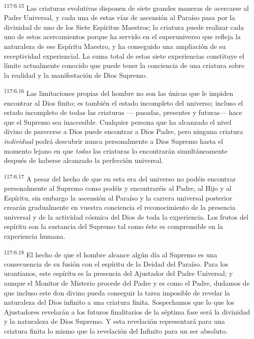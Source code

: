\documentclass[twoside, 11pt]{book}
\begin{document}
\par
\textsuperscript{117:6.15} Las criaturas evolutivas disponen de siete grandes maneras de acercarse al Padre Universal, y cada una de estas vías de ascensión al Paraíso pasa por la divinidad de uno de los Siete Espíritus Maestros; la criatura puede realizar cada uno de estos acercamientos porque ha servido en el superuniverso que refleja la naturaleza de ese Espíritu Maestro, y ha conseguido una ampliación de su receptividad experiencial. La suma total de estas siete experiencias constituye el límite actualmente conocido que puede tener la conciencia de una criatura sobre la realidad y la manifestación de Dios Supremo.

\par
\textsuperscript{117:6.16} Las limitaciones propias del hombre no son las únicas que le impiden encontrar al Dios finito; es también el estado incompleto del universo; incluso el estado incompleto de todas las criaturas --- pasadas, presentes y futuras--- hace que el Supremo sea inaccesible. Cualquier persona que ha alcanzado el nivel divino de parecerse a Dios puede encontrar a Dios Padre, pero ninguna criatura \textit{individual} podrá descubrir nunca personalmente a Dios Supremo hasta el momento lejano en que \textit{todas} las criaturas lo encontrarán simultáneamente después de haberse alcanzado la perfección universal.

\par
\textsuperscript{117:6.17} A pesar del hecho de que en esta era del universo no podéis encontrar personalmente al Supremo como podéis y encontraréis al Padre, al Hijo y al Espíritu, sin embargo la ascensión al Paraíso y la carrera universal posterior crearán gradualmente en vuestra conciencia el reconocimiento de la presencia universal y de la actividad cósmica del Dios de toda la experiencia. Los frutos del espíritu son la sustancia del Supremo tal como éste es comprensible en la experiencia humana.

\par
\textsuperscript{117:6.18} El hecho de que el hombre alcance algún día al Supremo es una consecuencia de su fusión con el espíritu de la Deidad del Paraíso. Para los urantianos, este espíritu es la presencia del Ajustador del Padre Universal; y aunque el Monitor de Misterio procede del Padre y es como el Padre, dudamos de que incluso este don divino pueda conseguir la tarea imposible de revelar la naturaleza del Dios infinito a una criatura finita. Sospechamos que lo que los Ajustadores revelarán a los futuros finalitarios de la séptima fase será la divinidad y la naturaleza de Dios Supremo. Y esta revelación representará para una criatura finita lo mismo que la revelación del Infinito para un ser absoluto.
\end{document}
